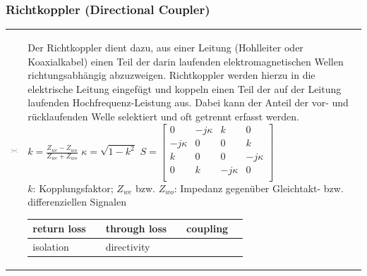 \subsubsection{Richtkoppler (Directional Coupler) }
\begin{tabular}{ll}
\includegraphics[width=3cm]{./bilder/rfdesign_directional_coupler.png}
  & \parbox{15cm}{
    Der Richtkoppler dient dazu, aus einer Leitung (Hohlleiter oder Koaxialkabel) einen Teil der darin laufenden elektromagnetischen Wellen richtungsabhängig abzuzweigen.
    Richtkoppler werden hierzu in die elektrische Leitung eingefügt und koppeln
	einen Teil der auf der Leitung laufenden Hochfrequenz-Leistung aus. Dabei kann
	der Anteil der vor- und rücklaufenden Welle selektiert und oft getrennt
	erfasst werden. \\
	$k = \frac{Z_{we} - Z_{wo}}{Z_{we} + Z_{wo}}$ \qquad $\kappa = \sqrt{1-k^2}$
	\qquad $S = \begin{bmatrix} 
         0        & -j\kappa & k        & 0        \\
         -j\kappa & 0        & 0        & k        \\
         k        & 0        & 0        & -j\kappa \\
         0        & k        & -j\kappa & 0        \\
         \end{bmatrix}$ \\
    $k$: Kopplungsfaktor; $Z_{we}$ bzw. $Z_{wo}$: Impedanz gegenüber
    Gleichtakt- bzw. differenziellen Signalen \\
    
    \begin{tabular}{|ll|ll|ll|}
    \hline
    return loss & $RL = -20\log |s_{11}|$
        & through loss & $T = -20\log |s_{21}|$
        & coupling & $C = -20\log |s_{31}|$ \\
    \hline
    isolation & $I = -20\log |s_{41}|$
        & directivity & $D = I-C$
        & &\\
    \hline
    \end{tabular}
    }
\end{tabular}


